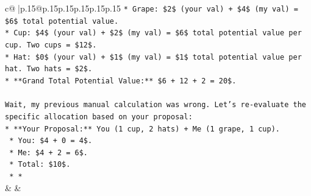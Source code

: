 \documentclass{article}
\begin{document}
{\begin{supertabular}{c@{$\;$}|p{.15\linewidth}@{}p{.15\linewidth}p{.15\linewidth}p{.15\linewidth}p{.15\linewidth}p{.15\linewidth}}
{{{\texttt{*   Grape: \$2\$ (your val) + \$4\$ (my val) = \$6\$ total potential value.} \\
\texttt{*   Cup: \$4\$ (your val) + \$2\$ (my val) = \$6\$ total potential value per cup. Two cups = \$12\$.} \\
\texttt{*   Hat: \$0\$ (your val) + \$1\$ (my val) = \$1\$ total potential value per hat. Two hats = \$2\$.} \\
\texttt{*   **Grand Total Potential Value:** \$6 + 12 + 2 = 20\$.} \\
\\ 
\texttt{Wait, my previous manual calculation was wrong. Let's re{-}evaluate the specific allocation based on your proposal:} \\
\texttt{*   **Your Proposal:** You (1 cup, 2 hats) + Me (1 grape, 1 cup).} \\
\texttt{    *   You: \$4 + 0 = 4\$.} \\
\texttt{    *   Me: \$4 + 2 = 6\$.} \\
\texttt{    *   Total: \$10\$.} \\
\texttt{    *   *} \\
            }
        }
    }
    & & \\ \\


\end{supertabular}}
\end{document}
